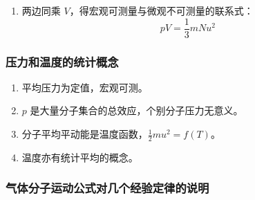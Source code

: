 \begin{enumerate}
\begin{enumerate}
        \item 两边同乘 $V$，得宏观可测量与微观不可测量的联系式：
        \begin{equation}
            pV = \frac13 m N u^2
        \end{equation}
    \end{enumerate}
\end{enumerate}

\subsubsection{压力和温度的统计概念}

\begin{enumerate}
    \item 平均压力为定值，宏观可测。
    \item $p$ 是大量分子集合的总效应，个别分子压力无意义。
    \item 分子平均平动能是温度函数，$\frac12 m u^2 = f(T)$。
    \item 温度亦有统计平均的概念。
\end{enumerate}

\subsubsection{气体分子运动公式对几个经验定律的说明}

